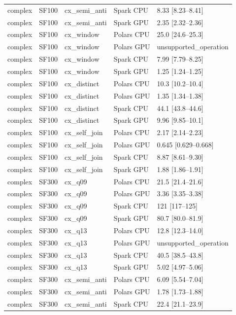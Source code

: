 \begin{longtable}{lllll}
complex & SF100 & cx\_semi\_anti & Spark CPU & 8.33 [8.23--8.41] \\
complex & SF100 & cx\_semi\_anti & Spark GPU & 2.35 [2.32--2.36] \\
complex & SF100 & cx\_window & Polars CPU & 25.0 [24.6--25.3] \\
complex & SF100 & cx\_window & Polars GPU & unsupported\_operation \\
complex & SF100 & cx\_window & Spark CPU & 7.99 [7.79--8.25] \\
complex & SF100 & cx\_window & Spark GPU & 1.25 [1.24--1.25] \\
complex & SF100 & cx\_distinct & Polars CPU & 10.3 [10.2--10.4] \\
complex & SF100 & cx\_distinct & Polars GPU & 1.35 [1.34--1.38] \\
complex & SF100 & cx\_distinct & Spark CPU & 44.1 [43.8--44.6] \\
complex & SF100 & cx\_distinct & Spark GPU & 9.96 [9.85--10.1] \\
complex & SF100 & cx\_self\_join & Polars CPU & 2.17 [2.14--2.23] \\
complex & SF100 & cx\_self\_join & Polars GPU & 0.645 [0.629--0.668] \\
complex & SF100 & cx\_self\_join & Spark CPU & 8.87 [8.61--9.30] \\
complex & SF100 & cx\_self\_join & Spark GPU & 1.88 [1.86--1.91] \\
complex & SF300 & cx\_q09 & Polars CPU & 21.5 [21.4--21.6] \\
complex & SF300 & cx\_q09 & Polars GPU & 3.36 [3.35--3.38] \\
complex & SF300 & cx\_q09 & Spark CPU & 121 [117--125] \\
complex & SF300 & cx\_q09 & Spark GPU & 80.7 [80.0--81.9] \\
complex & SF300 & cx\_q13 & Polars CPU & 12.8 [12.3--14.0] \\
complex & SF300 & cx\_q13 & Polars GPU & unsupported\_operation \\
complex & SF300 & cx\_q13 & Spark CPU & 40.5 [38.5--43.8] \\
complex & SF300 & cx\_q13 & Spark GPU & 5.02 [4.97--5.06] \\
complex & SF300 & cx\_semi\_anti & Polars CPU & 6.09 [5.54--7.04] \\
complex & SF300 & cx\_semi\_anti & Polars GPU & 1.78 [1.73--1.88] \\
complex & SF300 & cx\_semi\_anti & Spark CPU & 22.4 [21.1--23.9] \\

\end{longtable}
